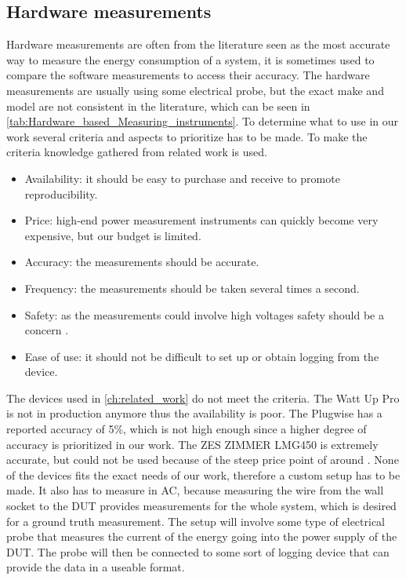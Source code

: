 \subsection{Hardware measurements} \label{sec:clampIntro}
Hardware measurements are often from the literature seen as the most accurate way to measure the energy consumption of a system, it is sometimes used to compare the software measurements to access their accuracy\cite{fahad2019comparative}. The hardware measurements are usually using some electrical probe, but the exact make and model are not consistent in the literature, which can be seen in \cref{tab:Hardware_based_Measuring_instruments}.
To determine what to use in our work several criteria and aspects to prioritize has to be made. To make the criteria knowledge gathered from related work is used.
\begin{itemize}
    \item Availability: it should be easy to purchase and receive to promote reproducibility.
    \item Price: high-end power measurement instruments can quickly become very expensive, but our budget is limited.
    \item Accuracy: the measurements should be accurate.
    \item Frequency: the measurements should be taken several times a second.
    \item Safety: as the measurements could involve high voltages safety should be a concern \cite{sik}.
    \item Ease of use: it should not be difficult to set up or obtain logging from the device.
\end{itemize}
The devices used in \cref{ch:related_work} do not meet the criteria. The Watt Up Pro is not in production anymore thus the availability is poor. The Plugwise has a reported accuracy of 5\%, which is not high enough since a higher degree of accuracy is prioritized in our work. The ZES ZIMMER LMG450 is extremely accurate, but could not be used because of the steep price point of around . None of the devices fits the exact needs of our work, therefore a custom setup has to be made. It also has to measure in AC, because measuring the wire from the wall socket to the DUT provides measurements for the whole system, which is desired for a ground truth measurement. The setup will involve some type of electrical probe that measures the current of the energy going into the power supply of the DUT. The probe will then be connected to some sort of logging device that can provide the data in a useable format. 

